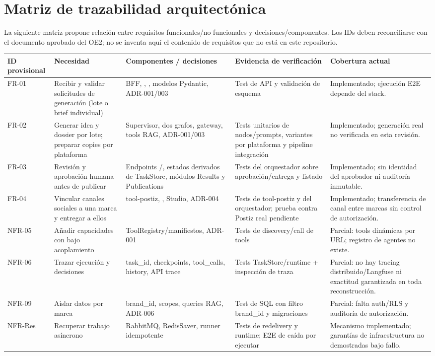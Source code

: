 \documentclass[12pt,oneside]{report}
\newcommand{\code}[1]{\texttt{\detokenize{#1}}}
\begin{document}
\section{Matriz de trazabilidad arquitectónica}
La siguiente matriz propone relación entre requisitos funcionales/no funcionales y decisiones/componentes. Los IDs deben reconciliarse con el documento aprobado del OE2; no se inventa aquí el contenido de requisitos que no está en este repositorio.
\begin{longtable}{p{1.6cm}p{3.3cm}p{4.1cm}p{3.5cm}p{2.0cm}}
\toprule
ID provisional & Necesidad & Componentes / decisiones & Evidencia de verificación & Cobertura actual \\
\midrule
FR-01 & Recibir y validar solicitudes de generación (lote o brief individual) & BFF, \code{POST /ideas/generate}, \code{POST /process}, modelos Pydantic, ADR-001/003 & Test de API y validación de esquema & Implementado; ejecución E2E depende del stack. \\
FR-02 & Generar idea y dossier por lote; preparar copies por plataforma & Supervisor, dos grafos, gateway, tools RAG, ADR-001/003 & Tests unitarios de nodos/prompts, variantes por plataforma y pipeline integración & Implementado; generación real no verificada en esta revisión. \\
FR-03 & Revisión y aprobación humana antes de publicar & Endpoints \code{approve}/\code{deliver}, estados derivados de TaskStore, módulos Results y Publications & Tests del orquestador sobre aprobación/entrega y listado & Implementado; sin identidad del aprobador ni auditoría inmutable. \\
FR-04 & Vincular canales sociales a una marca y entregar a ellos & tool-postiz, \code{brand_channels}, Studio, ADR-004 & Tests de tool-postiz y del orquestador; prueba contra Postiz real pendiente & Implementado; transferencia de canal entre marcas sin control de autorización. \\
NFR-05 & Añadir capacidades con bajo acoplamiento & ToolRegistry/manifiestos, ADR-001 & Tests de discovery/call de tools & Parcial: tools dinámicas por URL; registro de agentes no existe. \\
NFR-06 & Trazar ejecución y decisiones & task\_id, checkpoints, tool\_calls, history, API trace & Tests TaskStore/runtime + inspección de traza & Parcial: no hay tracing distribuido/Langfuse ni exactitud garantizada en toda reconstrucción. \\
NFR-09 & Aislar datos por marca & brand\_id, scopes, queries RAG, ADR-006 & Test de SQL con filtro brand\_id y migraciones & Parcial: falta auth/RLS y auditoría de autorización. \\
NFR-Res & Recuperar trabajo asíncrono & RabbitMQ, RedisSaver, runner idempotente & Tests de redelivery y runtime; E2E de caída por ejecutar & Mecanismo implementado; garantías de infraestructura no demostradas bajo fallo. \\
\bottomrule
\end{longtable}
\end{document}
